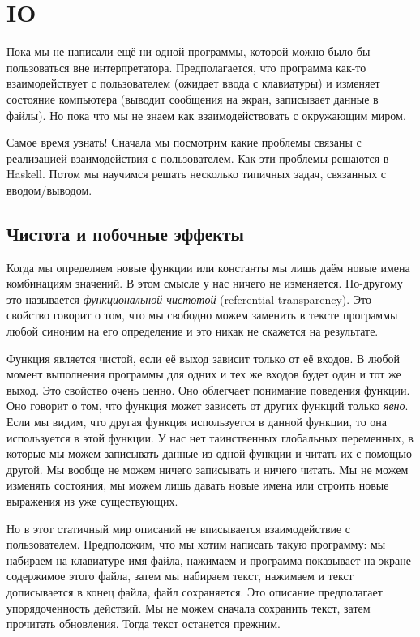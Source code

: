\chapter{IO}

Пока мы не написали ещё ни одной программы, которой можно было бы
пользоваться вне интерпретатора. Предполагается, что программа как-то
взаимодействует с пользователем (ожидает ввода с клавиатуры) и изменяет
состояние компьютера (выводит сообщения на экран, записывает данные в
файлы). Но пока что мы не знаем как взаимодействовать с окружающим
миром.

Самое время узнать! Сначала мы посмотрим какие проблемы связаны с
реализацией взаимодействия с пользователем. Как эти проблемы решаются в
Haskell. Потом мы научимся решать несколько типичных задач, связанных с
вводом/выводом.

\section{Чистота и побочные эффекты}

Когда мы определяем новые функции или константы мы лишь даём новые имена
комбинациям значений. В этом смысле у нас ничего не изменяется.
По-другому это называется \emph{функциональной чистотой} (referential
transparency). Это свойство говорит о том, что мы свободно можем
заменить в тексте программы любой синоним на его определение и это никак
не скажется на результате.

Функция является чистой, если её выход зависит только от её входов. В
любой момент выполнения программы для одних и тех же входов будет один и
тот же выход. Это свойство очень ценно. Оно облегчает понимание
поведения функции. Оно говорит о том, что функция может зависеть от
других функций только \emph{явно}. Если мы видим, что другая функция
используется в данной функции, то она используется в этой функции. У нас
нет таинственных глобальных переменных, в которые мы можем записывать
данные из одной функции и читать их с помощью другой. Мы вообще не можем
ничего записывать и ничего читать. Мы не можем изменять состояния, мы
можем лишь давать новые имена или строить новые выражения из уже
существующих.

Но в этот статичный мир описаний не вписывается взаимодействие с
пользователем. Предположим, что мы хотим написать такую программу: мы
набираем на клавиатуре имя файла, нажимаем  и программа
показывает на экране содержимое этого файла, затем мы набираем текст,
нажимаем  и текст дописывается в конец файла, файл
сохраняется. Это описание предполагает упорядоченность действий. Мы не
можем сначала сохранить текст, затем прочитать обновления. Тогда текст
останется прежним.

